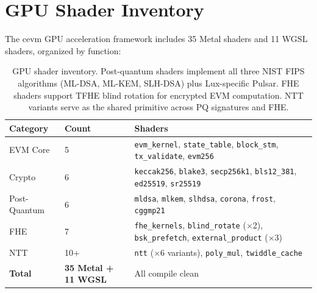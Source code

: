 \section{GPU Shader Inventory}


The cevm GPU acceleration framework includes 35 Metal shaders and 11 WGSL shaders,
organized by function:

\begin{table}[h]
\centering
\small
\begin{tabular}{llp{5.5cm}}
\toprule
\textbf{Category} & \textbf{Count} & \textbf{Shaders} \\
\midrule
EVM Core & 5 & \texttt{evm\_kernel}, \texttt{state\_table},
               \texttt{block\_stm}, \texttt{tx\_validate}, \texttt{evm256} \\
\addlinespace
Crypto & 6 & \texttt{keccak256}, \texttt{blake3}, \texttt{secp256k1},
             \texttt{bls12\_381}, \texttt{ed25519}, \texttt{sr25519} \\
\addlinespace
Post-Quantum & 6 & \texttt{mldsa}, \texttt{mlkem}, \texttt{slhdsa},
                    \texttt{corona}, \texttt{frost}, \texttt{cggmp21} \\
\addlinespace
FHE & 7 & \texttt{fhe\_kernels}, \texttt{blind\_rotate} ($\times$2),
          \texttt{bsk\_prefetch}, \texttt{external\_product} ($\times$3) \\
\addlinespace
NTT & 10+ & \texttt{ntt} ($\times$6 variants), \texttt{poly\_mul},
            \texttt{twiddle\_cache} \\
\midrule
\textbf{Total} & \textbf{35 Metal + 11 WGSL} & All compile clean \\
\bottomrule
\end{tabular}
\caption{GPU shader inventory. Post-quantum shaders implement all three NIST FIPS
algorithms (ML-DSA, ML-KEM, SLH-DSA) plus Lux-specific Pulsar. FHE shaders
support TFHE blind rotation for encrypted EVM computation. NTT variants serve
as the shared primitive across PQ signatures and FHE.}
\label{tab:shaders}
\end{table}

